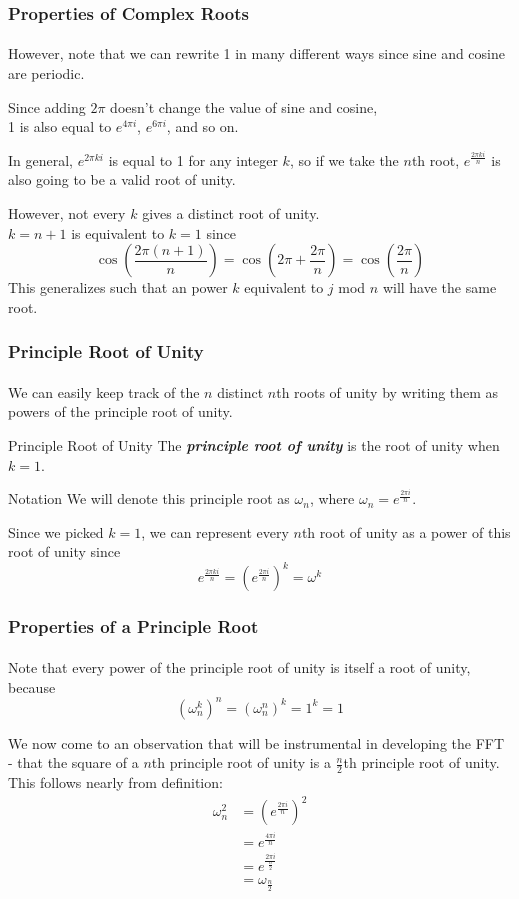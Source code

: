 \documentclass[11pt,handout]{beamer}             %
\newcommand{\emphasis}[1]{\textbf{\textit{#1}}}
\begin{document}
\begin{frame}
\frametitle{Properties of Complex Roots}
\framesubtitle{}
However, note that we can rewrite 1 in many different ways
since sine and cosine are periodic. \pause

Since adding \( 2 \pi \) doesn't change the value of sine and cosine, \\
1 is also equal to \( e^{4 \pi i} \), \( e^{6 \pi i} \), and so on. \pause

In general, \( e^{2 \pi k i} \) is equal to 1 for any integer \( k \), so if we
take the \( n \)th root, \( e^{\frac{2 \pi k i}{n}} \)
is also going to be a valid root of unity. \pause 

However, not every \( k \) gives a distinct root of unity. \\
\( k = n + 1 \) is equivalent to \( k = 1 \) since
\[ \cos(\frac{2 \pi(n + 1)}{n}) = \cos(2 \pi + \frac{2 \pi}{n})
= \cos(\frac{2 \pi}{n}) \]
This generalizes such that an power \( k \) equivalent to \( j \) mod \( n \)
will have the same root.
\end{frame}

\begin{frame}
\frametitle{Principle Root of Unity}
\framesubtitle{}
We can easily keep track of the \( n \) distinct \( n \)th roots of unity by 
writing them as powers of the \alert{principle root of unity}.
\begin{alertblock}{Principle Root of Unity}
The \emphasis{principle root of unity} is the root of unity when \( k = 1 \).
\end{alertblock} \pause
\begin{block}{Notation}
We will denote this principle root as \( \omega_n \), where
\( \omega_n = e^{\frac{2 \pi i}{n}} \).
\end{block} \pause
Since we picked \( k = 1 \), we can represent every \( n \)th root of unity as 
a power of this root of unity since 
\[ e^{\frac{2 \pi k i}{n}} = (e^{\frac{2 \pi i}{n}})^k = \omega^k \] 
\end{frame}

\begin{frame}
\frametitle{Properties of a Principle Root}
\framesubtitle{}
Note that every power of the principle root of unity is itself a root of unity,
because \[ (\omega^k_n)^n = (\omega^n_n)^k = 1^k = 1 \] \pause 

We now come to an observation that will be instrumental in developing the FFT -
that the square of a \( n \)th principle root of unity is a \( \frac{n}{2} \)th
principle root of unity. \\
This follows nearly from definition:
\begin{align*}
  \omega_n^2 &= (e^{\frac{2 \pi i}{n}})^2 \\
             &= e^{\frac{4 \pi i}{n}} \\
             &= e^{\frac{2 \pi i}{\frac{n}{2}}} \\
             &= \omega_{\frac{n}{2}}
\end{align*}
\end{frame}
\end{document}
